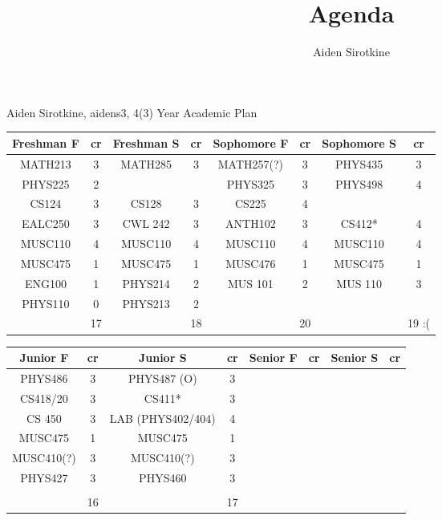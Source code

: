 \documentclass{article}
\date{}
\title{Agenda}
\author{Aiden Sirotkine}
\begin{document}
Aiden Sirotkine, aidens3, 4(3) Year Academic Plan
\begin{center}
\begin{tabular}{| c | c | c | c | c | c | c | c |}
Freshman F& cr & Freshman S & cr & Sophomore F & cr & Sophomore S & cr  \\ \hline
MATH213 & 3 & MATH285 & 3 & MATH257(?) & 3 & PHYS435& 3\\ \hline
PHYS225 & 2 & & & PHYS325 & 3 & PHYS498 & 4\\ \hline
CS124 & 3 & CS128 & 3 & CS225 & 4 &  & \\ \hline
EALC250 & 3 & CWL 242 & 3 & ANTH102 & 3 & CS412* & 4 \\ \hline
MUSC110 & 4 & MUSC110 & 4 & MUSC110 & 4 & MUSC110 & 4\\ \hline
MUSC475 & 1 & MUSC475 & 1 & MUSC476 & 1 & MUSC475 & 1 \\ \hline
ENG100 & 1 & PHYS214 & 2 & MUS 101 & 2 & MUS 110 & 3 \\ \hline
PHYS110 & 0 & PHYS213 & 2\\ \hline
 & 17 & & 18 & & 20 & & 19 :(\\ \hline


\end{tabular}
\end{center}

\begin{center}
\begin{tabular}{| c | c | c | c | c | c | c | c |}
Junior F& cr & Junior S & cr & Senior F & cr & Senior S & cr  \\ \hline
PHYS486 & 3 &  PHYS487 (O) & 3\\ \hline
CS418/20 & 3 & CS411* & 3 \\ \hline
CS 450 & 3 & LAB (PHYS402/404) & 4 	\\ \hline
MUSC475 & 1 & MUSC475 & 1 \\ \hline
MUSC410(?) & 3 & MUSC410(?) & 3 \\ \hline
PHYS427 & 3 & PHYS460 & 3 \\ \hline
 & & & \\ \hline
& 16 & & 17 \\ \hline


\end{tabular}
\end{center}


\end{document}
